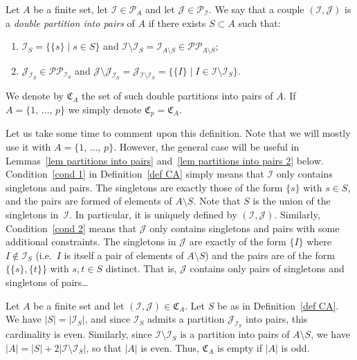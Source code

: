 \documentclass[AHL,Unicode,longabstracts,published]{cedram}
\newcommand{\I}{\mathcal{I}}
\newcommand{\J}{\mathcal{J}}
\newcommand{\frkC}{\mathfrak{C}}
\newcommand{\pa}{\mathcal{P}\!}
\newcommand{\pp}{\mathcal{P\!P}\!}
\begin{document}
\begin{defi}\label{def CA}
Let $A$ be a finite set, let $\I \in \pa_A$ and let $\J \in \pa_\I$. We say that a couple $(\I,\J)$ is a \emph{double partition into pairs} of $A$ if there exists $S \subset A$ such that:
\begin{enumerate}
\item \label{cond 1}
$\I_S = \{\{s\} \mid s \in S\}$ and $\I \setminus \I_S = \I_{A \setminus S} \in \pp_{A \setminus S}$;
\item \label{cond 2}
$\J_{\I_S} \in \pp_{\I_S}$ and $\J \setminus \J_{\I_S} = \J_{\I \setminus \I_S} = \{\{I\} \mid I \in \I \setminus \I_S\}$.
\end{enumerate}
We denote by $\frkC_A$ the set of such double partitions into pairs of $A$. If $A = \{1,\,\dots,\,p\}$ we simply denote $\frkC_p = \frkC_A$.
\end{defi}

Let us take some time to comment upon this definition. Note that we will mostly use it with $A = \{1,\,\dots,\,p\}$. However, the general case will be useful in Lemmas~\ref{lem partitions into pairs} and~\ref{lem partitions into pairs 2} below. Condition~\eqref{cond 1} in Definition~\ref{def CA} simply means that $\I$ only contains singletons and pairs. The singletons are exactly those of the form $\{s\}$ with $s \in S$, and the pairs are formed of elements of $A \setminus S$. Note that $S$ is the union of the singletons in~$\I$. In particular, it is uniquely defined by $(\I,\J)$. Similarly, Condition~\eqref{cond 2} means that $\J$ only contains singletons and pairs with some additional constraints. The singletons in $\J$ are exactly of the form $\{I\}$ where $I \notin \I_S$ (i.e.~$I$ is itself a pair of elements of $A \setminus S$) and the pairs are of the form $\{\{s\},\{t\}\}$ with $s,t \in S$ distinct. That is, $\J$ contains only pairs of singletons and singletons of pairs\dots

\begin{rema}\label{rem conditions 1 and 2}
Let $A$ be a finite set and let $(\I,\J) \in \frkC_A$. Let $S$ be as in Definition~\ref{def CA}. We have $|S| = |\I_S|$, and since $\I_S$ admits a partition $\J_{\I_S}$ into pairs, this cardinality is even. Similarly, since $\I \setminus \I_S$ is a partition into pairs of $A \setminus S$, we have $|A| = |S| + 2|\I \setminus \I_S|$, so that $|A|$ is even. Thus, $\frkC_A$ is empty if $|A|$ is odd.
\end{rema}
\end{document}
